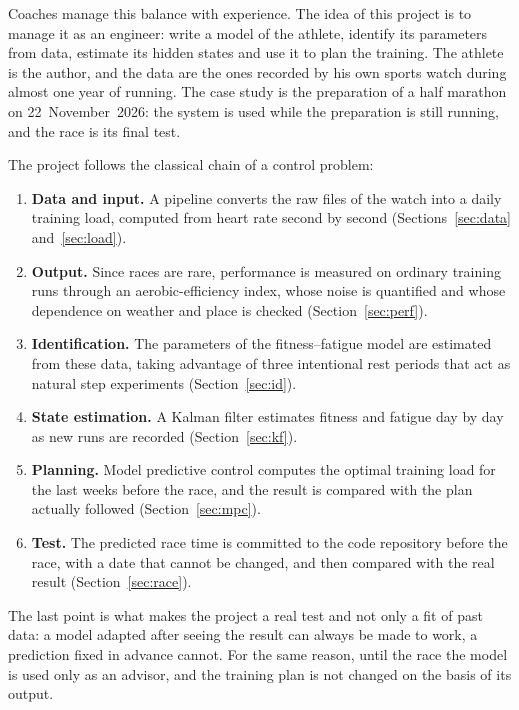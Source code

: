 \documentclass[11pt,a4paper]{article}
\begin{document}
Coaches manage this balance with experience. The idea of this project is to
manage it as an engineer: write a model of the athlete, identify its
parameters from data, estimate its hidden states and use it to plan the
training. The athlete is the author, and the data are the ones recorded by his
own sports watch during almost one year of running. The case study is the
preparation of a half marathon on 22~November~2026: the system is used while
the preparation is still running, and the race is its final test.

The project follows the classical chain of a control problem:
\begin{enumerate}
  \item \textbf{Data and input.} A pipeline converts the raw files of the
  watch into a daily training load, computed from heart rate second by second
  (Sections~\ref{sec:data} and~\ref{sec:load}).
  \item \textbf{Output.} Since races are rare, performance is measured on
  ordinary training runs through an aerobic-efficiency index, whose noise is
  quantified and whose dependence on weather and place is checked
  (Section~\ref{sec:perf}).
  \item \textbf{Identification.} The parameters of the fitness--fatigue model
  are estimated from these data, taking advantage of three intentional rest
  periods that act as natural step experiments (Section~\ref{sec:id}).
  \item \textbf{State estimation.} A Kalman filter estimates fitness and
  fatigue day by day as new runs are recorded (Section~\ref{sec:kf}).
  \item \textbf{Planning.} Model predictive control computes the optimal
  training load for the last weeks before the race, and the result is compared
  with the plan actually followed (Section~\ref{sec:mpc}).
  \item \textbf{Test.} The predicted race time is committed to the code
  repository before the race, with a date that cannot be changed, and then
  compared with the real result (Section~\ref{sec:race}).
\end{enumerate}

The last point is what makes the project a real test and not only a fit of
past data: a model adapted after seeing the result can always be made to work,
a prediction fixed in advance cannot. For the same reason, until the race the
model is used only as an advisor, and the training plan is not changed on the
basis of its output.
\end{document}
